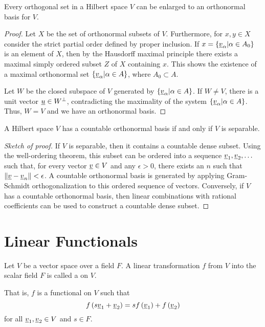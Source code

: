 \begin{theorem}
Every orthogonal set in a Hilbert space $V$ can be enlarged to an orthonormal basis for $V$.
\end{theorem}
\begin{proof}
Let $X$ be the set of orthonormal subsets of $V$.
Furthermore, for $x, y \in X$ consider the strict partial order defined by proper inclusion.
If $x = \left\{ \underline{v}_{\alpha} | \alpha \in A_0 \right\}$ is an element of $X$, then by the Hausdorff maximal principle there exists a maximal simply ordered subset $Z$ of $X$ containing $x$.
This shows the existence of a maximal orthonormal set $\left\{ \underline{v}_{\alpha} | \alpha \in A \right\}$, where $A_0 \subset A$.

Let $W$ be the closed subspace of $V$ generated by $\left\{ \underline{v}_{\alpha} | \alpha \in A \right\}$.
If $W \neq V$, there is a unit vector $\underline{u} \in W^{\bot}$, contradicting the maximality of the system $\left\{ \underline{v}_{\alpha} | \alpha \in A \right\}$.
Thus, $W = V$ and we have an orthonormal basis.
\end{proof}

\begin{theorem} \label{theorem:SeparableHilbertSpace}
A Hilbert space $V$ has a countable orthonormal basis if and only if $V$ is separable.
\end{theorem}
\begin{proof}[Sketch of proof]
If $V$ is separable, then it contains a countable dense subset.
Using the well-ordering theorem, this subset can be ordered into a sequence $\underline{v}_1 , \underline{v}_2 , \ldots$ such that, for every vector $\underline{v}\in V$ and any $\epsilon>0$, there exists an $n$ such that $\left\| \underline{v} - \underline{v}_n \right\| < \epsilon$.
A countable orthonormal basis is generated by applying Gram-Schmidt orthogonalization to this ordered sequence of vectors.
Conversely, if $V$ has a countable orthonormal basis, then linear combinations with rational coefficients can be used to construct a countable dense subset.
\end{proof}


\section{Linear Functionals}

\begin{definition}
Let $V$ be a vector space over a field $F$.
A linear transformation $f$ from $V$ into the scalar field $F$ is called a  on $V$.
\end{definition}
That is, $f$ is a functional on $V$ such that
\begin{equation*}
f \left( s \underline{v}_1 + \underline{v}_2 \right)
= s f \left( \underline{v}_1 \right) + f \left( \underline{v}_2 \right)
\end{equation*}
for all $\underline{v}_1, \underline{v}_2 \in V$ and $s \in F$.


